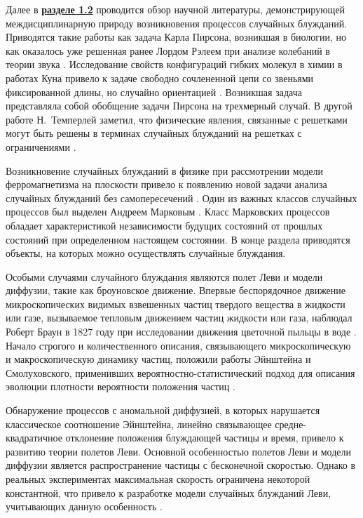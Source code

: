 Далее в \underline{\textbf{разделе 1.2}} проводится обзор научной литературы, демонстрирующей междисциплинарную природу возникновения процессов случайных блужданий. Приводятся такие работы как задача Карла Пирсона, возникшая в биологии, но как оказалось уже решенная ранее Лордом Рэлеем при анализе колебаний в теории звука \cite{pearson_problem_1905,rayleigh_problem_1905}. Исследование свойств конфигураций гибких молекул в химии в работах Куна привело к задаче свободно сочлененной цепи со звеньями фиксированной длины, но случайно ориентацией \cite{kuhn_uber_1930}. Возникшая задача представляла собой обобщение задачи Пирсона на трехмерный случай. В другой работе Н.~Темперлей заметил, что физические явления, связанные с решетками могут быть решены в терминах случайных блужданий на решетках с ограничениями \cite{temperley_combinatorial_1956}.

Возникновение случайных блужданий в физике при рассмотрении модели ферромагнетизма на плоскости привело к появлению  новой задачи анализа случайных блужданий без самопересечений \cite{gee_interaction_1946}. Один из важных классов случайных процессов был выделен Андреем Марковым \cite{markov_wahrscheinlichkeitsrechnung_1912}. Класс Марковских процессов обладает характеристикой независимости будущих состояний от прошлых состояний при определенном настоящем состоянии. В конце раздела приводятся объекты, на которых можно осуществлять случайные блуждания.

Особыми случаями случайного блуждания являются полет Леви и модели диффузии, такие как броуновское движение. Впервые беспорядочное движение микроскопических видимых взвешенных частиц твердого вещества в жидкости или газе, вызываемое тепловым движением частиц жидкости или газа, наблюдал Роберт Браун в 1827 году при исследовании движения цветочной пыльцы в воде \cite{brown_brief_2015}. Начало строгого и количественного описания, связывающего микроскопическую и макроскопическую динамику частиц, положили работы Эйнштейна и Смолуховского, применивших вероятностно-статистический подход для описания эволюции плотности вероятности положения частиц \cite{einstein_uber_1905,vonsmoluchowski_zur_1906}.

Обнаружение процессов с аномальной диффузией, в которых нарушается классическое соотношение Эйнштейна, линейно связывающее средне-квадратичное отклонение положения блуждающей частицы и время, привело к развитию теории полетов Леви. Основной особенностью полетов Леви и модели диффузии является распространение частицы с бесконечной скоростью. Однако в реальных экспериментах максимальная скорость ограничена некоторой константной, что привело к разработке модели случайных блужданий Леви, учитывающих данную особенность \cite{gnedenko_predelnye_1949}.

